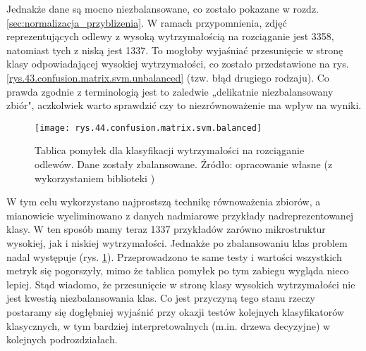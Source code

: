 Jednakże dane są mocno niezbalansowane, co zostało pokazane w rozdz. \ref{sec:normalizacja_przyblizenia}. W ramach przypomnienia, zdjęć reprezentujących odlewy z wysoką wytrzymałością na rozciąganie jest 3358, natomiast tych z niską jest 1337. To mogłoby wyjaśniać przesunięcie w stronę klasy odpowiadającej wysokiej wytrzymałości, co zostało przedstawione na rys. \ref{rys.43.confusion.matrix.svm.unbalanced} (tzw. błąd drugiego rodzaju). Co prawda zgodnie z terminologią jest to zaledwie „delikatnie niezbalansowany zbiór", aczkolwiek warto sprawdzić czy to niezrównoważenie ma wpływ na wyniki.
\begin{figure}[h]
    \centering
    \texttt{[image: rys.44.confusion.matrix.svm.balanced]}
    \caption{Tablica pomyłek dla klasyfikacji wytrzymałości na rozciąganie odlewów. Dane zostały zbalansowane. Źródło: opracowanie własne (z wykorzystaniem biblioteki )}
    \label{rys.44.confusion.matrix.svm.balanced}
\end{figure}
W tym celu wykorzystano najprostszą technikę równoważenia zbiorów, a mianowicie wyeliminowano z danych nadmiarowe przykłady nadreprezentowanej klasy. W ten sposób mamy teraz 1337 przykładów zarówno mikrostruktur wysokiej, jak i niskiej wytrzymałości. Jednakże po zbalansowaniu klas problem nadal występuje (rys. \ref{rys.44.confusion.matrix.svm.balanced}). Przeprowadzono te same testy i wartości wszystkich metryk się pogorszyły, mimo że tablica pomyłek po tym zabiegu wygląda nieco lepiej. Stąd wiadomo, że przesunięcie w stronę klasy wysokich wytrzymałości nie jest kwestią niezbalansowania klas. Co jest przyczyną tego stanu rzeczy postaramy się dogłębniej wyjaśnić przy okazji testów kolejnych klasyfikatorów klasycznych, w tym bardziej interpretowalnych (m.in. drzewa decyzyjne) w kolejnych podrozdziałach.

